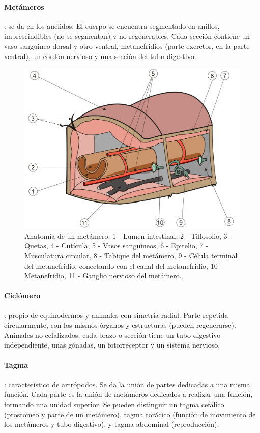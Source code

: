 \paragraph{Metámeros}: se da en los anélidos. El cuerpo se encuentra segmentado en anillos, imprescindibles (no se segmentan) y no regenerables. Cada sección contiene un vaso sanguineo dorsal y otro ventral, metanefridios (parte excretor, en la parte ventral), un cordón nervioso y una sección del tubo digestivo.
\begin{figure}[H]
    \centering
    \includegraphics[width=0.5\columnwidth]{A.imagenes/ACV-ANATANIM-Metameros}
    \caption[Anatomía de un metámero]{Anatomía de un metámero: 1 - Lumen intestinal, 2 - Tiflosolio, 3 - Quetas, 4 - Cutícula, 5 - Vasos sanguíneos, 6 - Epitelio, 7 - Musculatura circular, 8 - Tabique del metámero, 9 - Célula terminal del metanefridio, conectando con el canal del metanefridio, 10 - Metanefridio, 11 - Ganglio nervioso del metámero.}
\end{figure}
\paragraph{Ciclómero}: propio de equinodermos y animales con simetría radial. Parte repetida circularmente, con los mismos órganos y estructuras (pueden regenerarse). Animales no cefalizados, cada brazo o sección tiene un tubo digestivo independiente, unas gónadas, un fotorreceptor y un sistema nervioso.
\paragraph{Tagma}: característico de artrópodos. Se da la unión de partes dedicadas a una misma función. Cada parte es la unión de metámeros dedicados a realizar una función, formando una unidad superior.  Se pueden distinguir un tagma cefálico (prostomeo y parte de un metámero), tagma torácico (función de movimiento de los metámeros y tubo digestivo), y tagma abdominal (reproducción).
